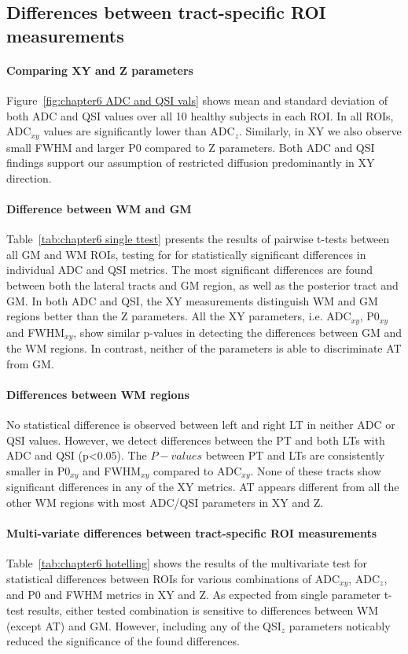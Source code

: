 \subsection*{Differences between tract-specific ROI measurements}
\label{par:chapter6 tract specific}
\paragraph{Comparing XY and Z parameters }
Figure~\ref{fig:chapter6 ADC and QSI vals} shows mean and standard deviation of both \gls{ADC} and \gls{QSI} values over all 10 healthy subjects in each \gls{ROI}. In all ROIs, ADC$_{xy}$ values are significantly lower than ADC$_{z}$. Similarly, in XY we also observe small FWHM and larger P0 compared to Z parameters. Both ADC and QSI findings support our assumption of restricted diffusion predominantly in XY direction.

\paragraph{Difference between WM and GM }
Table~\ref{tab:chapter6 single ttest} presents the results of pairwise t-tests between all GM and WM \glspl{ROI}, testing for for statistically significant differences in individual ADC and QSI metrics. The most significant differences are found between both the lateral tracts and GM region, as well as the posterior tract and GM. In both ADC and QSI, the XY measurements distinguish WM and GM regions better than the Z parameters. All the XY parameters, i.e. ADC$_{xy}$, P0$_{xy}$ and FWHM$_{xy}$, show similar p-values in detecting the differences between GM and the WM regions. In contrast, neither of the parameters is able to discriminate AT from GM.

\paragraph{Differences between WM regions}
No statistical difference is observed between left and right LT in neither ADC or QSI values. However, we detect differences between the PT and both LTs with ADC and QSI (p<0.05). The $P-values$ between PT and LTs are consistently smaller in P0$_{xy}$ and FWHM$_{xy}$ compared to ADC$_{xy}$. None of these tracts show significant differences in any of the XY metrics. AT appears different from all the other WM regions with  most ADC/QSI parameters in XY and Z.

\paragraph*{Multi-variate differences between tract-specific ROI measurements }
Table~\ref{tab:chapter6 hotelling} shows the results of the multivariate test for statistical differences between \glspl{ROI} for various combinations of ADC$_{xy}$, ADC$_{z}$, and P0 and FWHM metrics in XY and Z. As expected from single parameter t-test results, either tested combination is sensitive to differences between WM (except AT) and GM. However, including any of the QSI$_z$ parameters noticably reduced the significance of the found differences.

